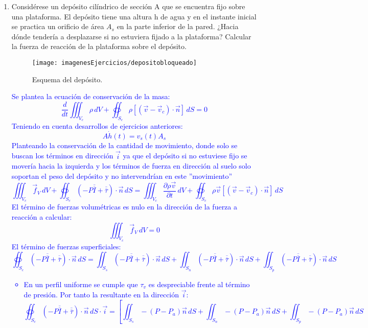 \begin{enumerate}
	\item Considérese un depósito cilíndrico de sección A que se encuentra fijo sobre una plataforma. El depósito tiene una altura h de agua y en el instante inicial se practica
	un orificio de área $A_s$ en la parte inferior de la pared. ¿Hacia dónde tendería a desplazarse
	si no estuviera fijado a la plataforma? Calcular la fuerza de reacción de la plataforma sobre
	el depósito.
 \begin{figure}[H]
 	\centering
 	\texttt{[image: imagenesEjercicios/depositobloqueado]}
 	\caption{Esquema del depósito.}
 	\label{fig:depositobloqueado}
 \end{figure}
 \textcolor{blue}
 {
 	Se plantea la ecuación de conservación de la masa: 
 	\[\dfrac{d}{dt}\iiint_{V_c}\rho\,dV+\oiint_{S_c} \rho\left[(\vec{v}-\vec{v}_c)\cdot\vec{n}\right] \,dS=0\]
 	Teniendo en cuenta desarrollos de ejercicios anteriores:
 	\[A\dot{h}(t)=v_s(t)A_s\]
 	Planteando la conservación de la cantidad de movimiento, donde solo se buscan los términos en dirección $\vec{i}$ ya que el depósito si no estuviese fijo se movería hacia la izquierda y los términos de fuerza en dirección al suelo solo soportan el peso del depósito y no intervendrían en este ''movimiento''
 	\[\iiint_{V_c}\vec{f}_V\,dV
 	+
 	\oiint_{S_c}\left(-P\overline{\overline{I}}+\overline{\overline{\tau}}\right)\cdot\vec{n}\,dS=
 	\iiint_{V_c}\dfrac{\partial \rho\vec{v}}{\partial t}\,dV
 	+\oiint_{S_c}\rho\vec{v}\left[\left(\vec{v}-\vec{v}_c\right)\cdot\vec{n}\right]\,dS\]
 	El término de fuerzas volumétricas es nulo en la dirección de la fuerza a reacción a calcular:
 	\[\iiint_{V_c}\vec{f}_V\,dV=0\]
 	El término de fuerzas superficiales:
 	\[\oiint_{S_c}\left(-P\overline{\overline{I}}+\overline{\overline{\tau}}\right)\cdot\vec{n}\,dS=
 	\iint_{S_s}\left(-P\overline{\overline{I}}+\overline{\overline{\tau}}\right)\cdot\vec{n}\,dS
 	+
 	\iint_{S_n}\left(-P\overline{\overline{I}}+\overline{\overline{\tau}}\right)\cdot\vec{n}\,dS
 	+
 	\iint_{S_p}\left(-P\overline{\overline{I}}+\overline{\overline{\tau}}\right)\cdot\vec{n}\,dS
 	\]
 	\begin{itemize}
 		\item En un perfil uniforme se cumple que $\tau_v$ es despreciable frente al término de presión. Por tanto la resultante en la dirección $\vec{i}$:
 		\[\oiint_{S_c}\left(-P\overline{\overline{I}}+\overline{\overline{\tau}}\right)\cdot\vec{n}\,dS\cdot\vec{i}=
 		\left[
 		\iint_{S_s}-(P-P_a)\vec{n}\,dS
 		+
 		\iint_{S_n}-(P-P_a)\vec{n}\,dS
 		+
 		\iint_{S_p}-(P-P_a)\vec{n}\,dS
\]
\end{itemize}}
\end{enumerate}
